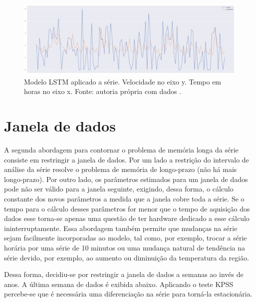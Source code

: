 \documentclass[
	12pt,				%
	openright,			%
	oneside,			%
	a4paper,			%
	english,			%
	french,				%
	spanish,			%
	brazil				%
	]{abntex2}
\begin{document}
\begin{figure}[h]
    \centering
	\includegraphics[width=\textwidth]{lstm.png}
	\caption{Modelo LSTM aplicado a série. Velocidade no eixo y. Tempo em horas no eixo x. Fonte: autoria própria com dados \cite{era5}.}
\end{figure}
\FloatBarrier 

\section{Janela de dados}\label{janela}

A segunda abordagem para contornar o problema de memória longa da série consiste em restringir a janela de dados. Por um lado a restrição do intervalo de análise da série resolve o problema de memória de longo-prazo (não há mais longo-prazo). Por outro lado, os parâmetros estimados para um janela de dados pode não ser válido para a janela seguinte, exigindo, dessa forma, o cálculo constante dos novos parâmetros a medida que a janela cobre toda a série. Se o tempo para o cálculo desses parâmetros for menor que o tempo de aquisição dos dados esse torna-se apenas uma questão de ter hardware dedicado a esse cálculo ininterruptamente. Essa abordagem também permite que mudanças na série sejam facilmente incorporadas ao modelo, tal como, por exemplo, trocar a série horária por uma série de 10 minutos ou uma mudança natural de tendência na série devido, por exemplo, ao aumento ou diminuição da temperatura da região.

Dessa forma, decidiu-se por restringir a janela de dados a semanas ao invés de anos. A última semana de dados é exibida abaixo. Aplicando o teste KPSS percebe-se que é necessária uma diferenciação na série para torná-la estacionária.
\end{document}
